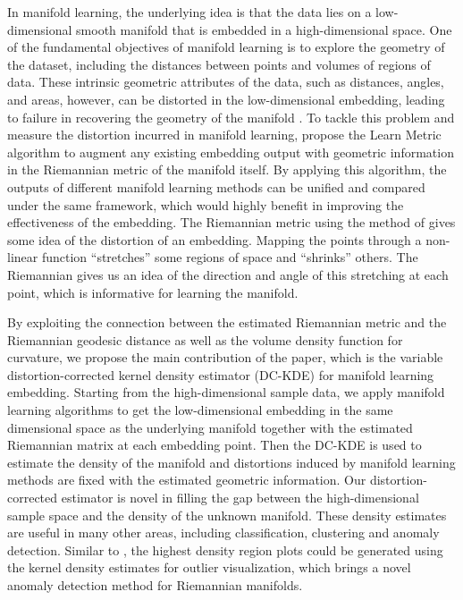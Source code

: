 \documentclass[11pt,a4paper,]{article}
\begin{document}
In manifold learning, the underlying idea is that the data lies on a low-dimensional smooth manifold that is embedded in a high-dimensional space. One of the fundamental objectives of manifold learning is to explore the geometry of the dataset, including the distances between points and volumes of regions of data. These intrinsic geometric attributes of the data, such as distances, angles, and areas, however, can be distorted in the low-dimensional embedding, leading to failure in recovering the geometry of the manifold \autocite{Goldberg2008-co}. To tackle this problem and measure the distortion incurred in manifold learning,
\textcite{Perrault-Joncas2013-pq} propose the Learn Metric algorithm to augment any existing embedding output with geometric information in the Riemannian metric of the manifold itself. By applying this algorithm, the outputs of different manifold learning methods can be unified and compared under the same framework, which would highly benefit in improving the effectiveness of the embedding.
The Riemannian metric using the method of \textcite{Perrault-Joncas2013-pq} gives some idea of the distortion of an embedding. Mapping the points through a non-linear function ``stretches'' some regions of space and ``shrinks'' others. The Riemannian gives us an idea of the direction and angle of this stretching at each point, which is informative for learning the manifold.

By exploiting the connection between the estimated Riemannian metric and the Riemannian geodesic distance as well as the volume density function for curvature, we propose the main contribution of the paper, which is the variable distortion-corrected kernel density estimator (DC-KDE) for manifold learning embedding. Starting from the high-dimensional sample data, we apply manifold learning algorithms to get the low-dimensional embedding in the same dimensional space as the underlying manifold together with the estimated Riemannian matrix at each embedding point. Then the DC-KDE is used to estimate the density of the manifold and distortions induced by manifold learning methods are fixed with the estimated geometric information. Our distortion-corrected estimator is novel in filling the gap between the high-dimensional sample space and the density of the unknown manifold. These density estimates are useful in many other areas, including classification, clustering and anomaly detection. Similar to \textcite{Cheng2021-dh}, the highest density region plots\autocite{Hyndman1996-lk} could be generated using the kernel density estimates for outlier visualization, which brings a novel anomaly detection method for Riemannian manifolds.
\end{document}
